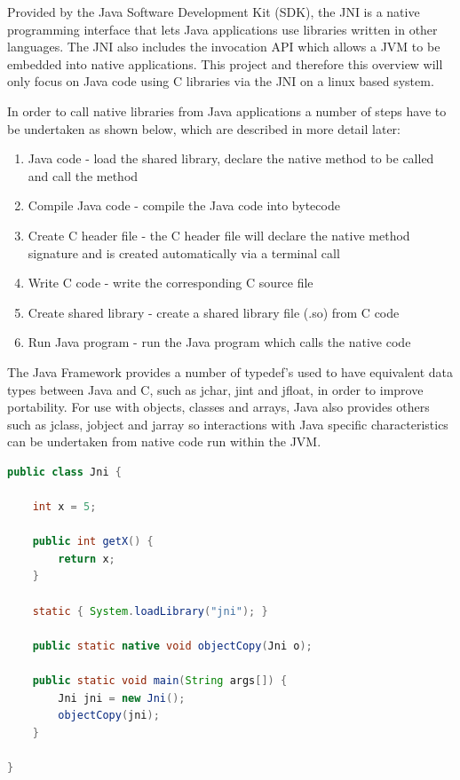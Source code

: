 \documentclass[final_report.tex]{subfiles}
\begin{document}
Provided by the Java Software Development Kit (SDK), the JNI is a native programming interface that lets Java applications use libraries written in other languages. The JNI also includes the invocation API which allows a JVM to be embedded into native applications. This project and therefore this overview will only focus on Java code using C libraries via the JNI on a linux based system.

In order to call native libraries from Java applications a number of steps have to be undertaken as shown below, which are described in more detail later:

\begin{enumerate}
	\item Java code - load the shared library, declare the native method to be called and call the method
	\item Compile Java code - compile the Java code into bytecode
	\item Create C header file - the C header file will declare the native method signature and is created automatically via a terminal call
	\item Write C code - write the corresponding C source file
	\item Create shared library - create a shared library file (.so) from C code
	\item Run Java program - run the Java program which calls the native code
\end{enumerate}

The Java Framework provides a number of typedef's used to have equivalent data types between Java and C, such as jchar, jint and jfloat, in order to improve portability. For use with objects, classes and arrays, Java also provides others such as jclass, jobject and jarray so interactions with Java specific characteristics can be undertaken from native code run within the JVM.

\begin{lstlisting}[language=Java, caption={Basic Java class showing native method declaration and calling with shared library loading}, label=lst:java]
public class Jni {

	int x = 5;

	public int getX() {
		return x;
	}

	static { System.loadLibrary("jni"); }

	public static native void objectCopy(Jni o);

	public static void main(String args[]) {
		Jni jni = new Jni();
		objectCopy(jni);
	}

}
\end{lstlisting}
\end{document}
